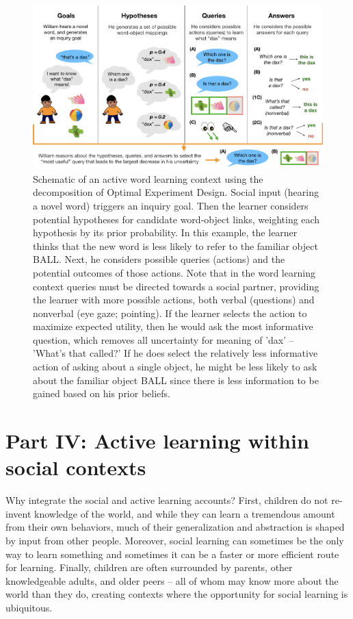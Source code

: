 \documentclass[english,floatsintext,man]{apa6}
\theoremstyle{definition}
\theoremstyle{definition}
\theoremstyle{definition}
\theoremstyle{remark}
\begin{document}
\begin{figure}[tb]
\includegraphics[width=0.95\linewidth]{macdonald_cada_files/figure-latex/unnamed-chunk-2-1} \caption{Schematic of an active word learning context using the decomposition of Optimal Experiment Design. Social input (hearing a novel word) triggers an inquiry goal. Then the learner considers potential hypotheses for candidate word-object links, weighting each hypothesis by its prior probability. In this example, the learner thinks that the new word is less likely to refer to the familiar object BALL. Next, he considers possible queries (actions) and the potential outcomes of those actions. Note that in the word learning context queries must be directed towards a social partner, providing the learner with more possible actions, both verbal (questions) and nonverbal (eye gaze; pointing). If the learner selects the action to maximize expected utility, then he would ask the most informative question, which removes all uncertainty for meaning of 'dax' -- 'What's that called?' If he does select the relatively less informative action of asking about a single object, he might be less likely to ask about the familiar object BALL since there is less information to be gained based on his prior beliefs.}\label{fig:unnamed-chunk-2}
\end{figure}

\section{Part IV: Active learning within social
contexts}\label{part-iv-active-learning-within-social-contexts}

Why integrate the social and active learning accounts? First, children
do not re-invent knowledge of the world, and while they can learn a
tremendous amount from their own behaviors, much of their generalization
and abstraction is shaped by input from other people. Moreover, social
learning can sometimes be the only way to learn something and sometimes
it can be a faster or more efficient route for learning. Finally,
children are often surrounded by parents, other knowledgeable adults,
and older peers -- all of whom may know more about the world than they
do, creating contexts where the opportunity for social learning is
ubiquitous.
\end{document}
